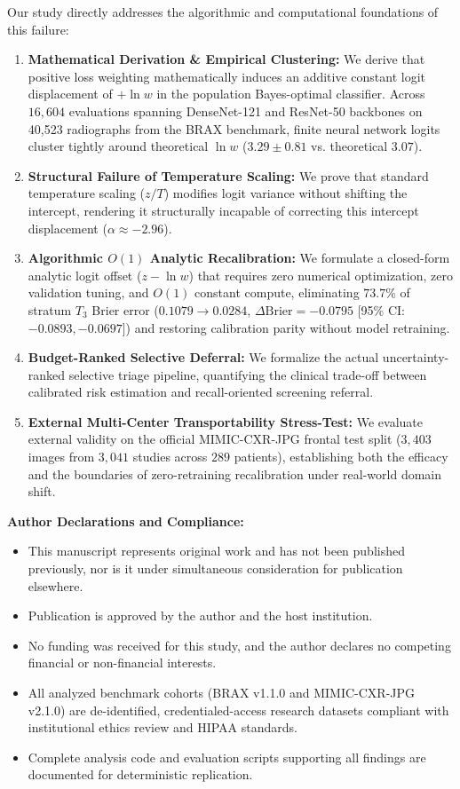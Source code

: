 \documentclass[11pt]{article}
\begin{document}
Our study directly addresses the algorithmic and computational foundations of this failure:
\begin{enumerate}
    \item \textbf{Mathematical Derivation \& Empirical Clustering:} We derive that positive loss weighting mathematically induces an additive constant logit displacement of $+\ln w$ in the population Bayes-optimal classifier. Across $16,604$ evaluations spanning DenseNet-121 and ResNet-50 backbones on 40,523 radiographs from the BRAX benchmark, finite neural network logits cluster tightly around theoretical $\ln w$ ($3.29 \pm 0.81$ vs. theoretical $3.07$).
    \item \textbf{Structural Failure of Temperature Scaling:} We prove that standard temperature scaling ($z / T$) modifies logit variance without shifting the intercept, rendering it structurally incapable of correcting this intercept displacement ($\alpha \approx -2.96$).
    \item \textbf{Algorithmic $O(1)$ Analytic Recalibration:} We formulate a closed-form analytic logit offset ($z - \ln w$) that requires zero numerical optimization, zero validation tuning, and $O(1)$ constant compute, eliminating $73.7\%$ of stratum $T_3$ Brier error ($0.1079 \to 0.0284$, $\Delta\text{Brier} = -0.0795$ [95\% CI: $-0.0893, -0.0697$]) and restoring calibration parity without model retraining.
    \item \textbf{Budget-Ranked Selective Deferral:} We formalize the actual uncertainty-ranked selective triage pipeline, quantifying the clinical trade-off between calibrated risk estimation and recall-oriented screening referral.
    \item \textbf{External Multi-Center Transportability Stress-Test:} We evaluate external validity on the official MIMIC-CXR-JPG frontal test split ($3,403$ images from $3,041$ studies across $289$ patients), establishing both the efficacy and the boundaries of zero-retraining recalibration under real-world domain shift.
\end{enumerate}

\textbf{Author Declarations and Compliance:}
\begin{itemize}
    \item This manuscript represents original work and has not been published previously, nor is it under simultaneous consideration for publication elsewhere.
    \item Publication is approved by the author and the host institution.
    \item No funding was received for this study, and the author declares no competing financial or non-financial interests.
    \item All analyzed benchmark cohorts (BRAX v1.1.0 and MIMIC-CXR-JPG v2.1.0) are de-identified, credentialed-access research datasets compliant with institutional ethics review and HIPAA standards.
    \item Complete analysis code and evaluation scripts supporting all findings are documented for deterministic replication.
\end{itemize}
\end{document}
